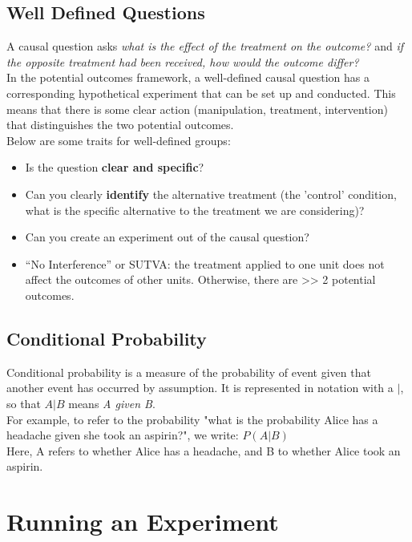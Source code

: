 \documentclass{article}
\begin{document}
\subsection{Well Defined Questions}
A causal question asks \textit{what is the effect of the treatment on the outcome?} and \textit{if the opposite treatment had been received, how would the outcome differ?} \\
In the potential outcomes framework, a well-defined causal question has a corresponding hypothetical experiment that can be set up and conducted. 
This means that there is some clear action (manipulation, treatment, intervention) that distinguishes the two potential outcomes.
\\
Below are some traits for well-defined groups:
\begin{itemize}
    \item Is the question \textbf{clear and specific}?
    \item Can you clearly \textbf{identify} the alternative treatment (the 'control' condition, what is the specific alternative to the treatment we are considering)?
    \item Can you create an experiment out of the causal question?
    \item “No Interference” or SUTVA: the treatment applied to one unit does not affect the outcomes of other units. Otherwise, there are >> 2 potential outcomes. 
\end{itemize}

\subsection{Conditional Probability}
Conditional probability is a measure of the probability of event given that another event has occurred by assumption. It is represented in notation with a $|$, so that $A|B$ means \textit{A given B}. 
\\
For example, to refer to the probability "what is the probability Alice has a headache given she took an aspirin?", we write: $P(A|B)$ \\
Here, A refers to whether Alice has a headache, and B to whether Alice took an aspirin.


\section{Running an Experiment}
\end{document}
